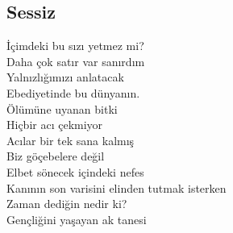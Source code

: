 \subsection{Sessiz}

İçimdeki bu sızı yetmez mi?  \\
Daha çok satır var sanırdım  \\
Yalnızlığımızı anlatacak \\
Ebediyetinde bu dünyanın.  \\

\noindent\newline
Ölümüne uyanan bitki \\
Hiçbir acı çekmiyor \\
Acılar bir tek sana kalmış \\
Biz göçebelere değil \\

\noindent\newline
Elbet sönecek içindeki nefes \\
Kanının son varisini elinden tutmak isterken \\
Zaman dediğin nedir ki? \\
Gençliğini yaşayan ak tanesi \\